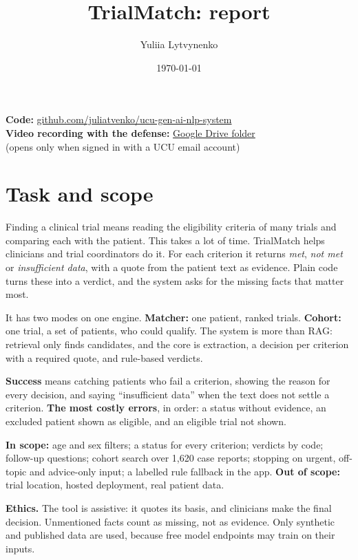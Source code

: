 \documentclass[11pt,a4paper]{article}
\title{TrialMatch: report}
\author{Yuliia Lytvynenko}
\date{\today}
\begin{document}
\maketitle

\begin{center}
\textbf{Code:} \href{https://github.com/juliatvenko/ucu-gen-ai-nlp-system}{github.com/juliatvenko/ucu-gen-ai-nlp-system}\\[4pt]
\textbf{Video recording with the defense:} \href{https://drive.google.com/drive/folders/1kLgAYUDZJBdlDy1W_TkI722TyYLyGJNW}{Google Drive folder}\\
\small (opens only when signed in with a UCU email account)
\end{center}

\section{Task and scope}

Finding a clinical trial means reading the eligibility criteria of many trials and comparing each with the patient. This takes a lot of time. TrialMatch helps clinicians and trial coordinators do it. For each criterion it returns \emph{met}, \emph{not met} or \emph{insufficient data}, with a quote from the patient text as evidence. Plain code turns these into a verdict, and the system asks for the missing facts that matter most.

It has two modes on one engine. \textbf{Matcher:} one patient, ranked trials. \textbf{Cohort:} one trial, a set of patients, who could qualify. The system is more than RAG: retrieval only finds candidates, and the core is extraction, a decision per criterion with a required quote, and rule-based verdicts.

\textbf{Success} means catching patients who fail a criterion, showing the reason for every decision, and saying ``insufficient data'' when the text does not settle a criterion. \textbf{The most costly errors}, in order: a status without evidence, an excluded patient shown as eligible, and an eligible trial not shown.

\textbf{In scope:} age and sex filters; a status for every criterion; verdicts by code; follow-up questions; cohort search over 1,620 case reports; stopping on urgent, off-topic and advice-only input; a labelled rule fallback in the app. \textbf{Out of scope:} trial location, hosted deployment, real patient data.

\textbf{Ethics.} The tool is assistive: it quotes its basis, and clinicians make the final decision. Unmentioned facts count as missing, not as evidence. Only synthetic and published data are used, because free model endpoints may train on their inputs.
\end{document}
